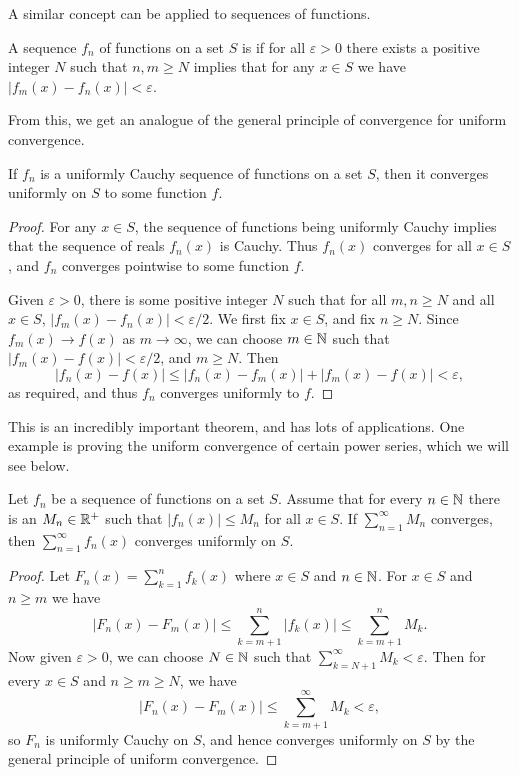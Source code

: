 \documentclass[a4paper]{scrartcl}
\begin{document}
A similar concept can be applied to sequences of functions.

\begin{definition}
    A sequence $f_n$ of functions on a set $S$ is  if for all $\varepsilon > 0$ there exists a positive integer $N$ such that $n, m \geq N$ implies that for any $x \in S$ we have $|f_m(x) - f_n(x)| < \varepsilon$.
\end{definition}

From this, we get an analogue of the general principle of convergence for uniform convergence.

\begin{theorem}
    If $f_n$ is a uniformly Cauchy sequence of functions on a set $S$, then it converges uniformly on $S$ to some function $f$.
\end{theorem}
\begin{proof}
    For any $x \in S$, the sequence of functions being uniformly Cauchy implies that the sequence of reals $f_n(x)$ is Cauchy. Thus $f_n(x)$ converges for all $x \in S$, and $f_n$ converges pointwise to some function $f$. 

    Given $\varepsilon > 0$, there is some positive integer $N$ such that for all $m, n \geq N$ and all $x \in S$, $|f_m(x) - f_n(x)| < \varepsilon/2$. We first fix $x \in S$, and fix $n \geq N$. Since $f_m(x) \rightarrow f(x)$ as $m \rightarrow \infty$, we can choose $m \in \mathbb{N}$ such that $|f_m(x) - f(x)| < \varepsilon/2$, and $m \geq N$. Then
    $$
    |f_n(x) - f(x)| \leq |f_n(x) - f_m(x)| + |f_m(x) - f(x)| < \varepsilon,
    $$
    as required, and thus $f_n$ converges uniformly to $f$.
\end{proof}


This is an incredibly important theorem, and has lots of applications. One example is proving the uniform convergence of certain power series, which we will see below.

\begin{theorem}
    Let $f_n$ be a sequence of functions on a set $S$. Assume that for every $n \in \mathbb{N}$ there is an $M_n \in \mathbb{R}^+$ such that $|f_n(x)| \leq M_n$ for all $x \in S$. If $\sum_{n = 1}^{\infty} M_n$ converges, then $\sum_{n = 1}^{\infty} f_n(x)$ converges uniformly on $S$.
\end{theorem}
\begin{proof}
    Let $F_n(x) = \sum_{k = 1}^n f_k(x)$ where $x \in S$ and $n \in \mathbb{N}$.
    For $x \in S$ and $n \geq m$ we have
    $$
    |F_n(x) - F_m(x)| \leq \sum_{k = m + 1}^n |f_k(x)| \leq \sum_{k = m + 1}^n M_k.
    $$
    Now given $\varepsilon>0$, we can choose $N \in \mathbb{N}$ such that $\sum_{k = N + 1}^{\infty} M_k < \varepsilon$. Then for every $x \in S$ and $n \geq m \geq N$, we have
    $$
    |F_n(x) - F_m(x)| \leq \sum_{k = m + 1}^{\infty} M_k < \varepsilon,
    $$
    so $F_n$ is uniformly Cauchy on $S$, and hence converges uniformly on $S$ by the general principle of uniform convergence.
\end{proof}
\end{document}
